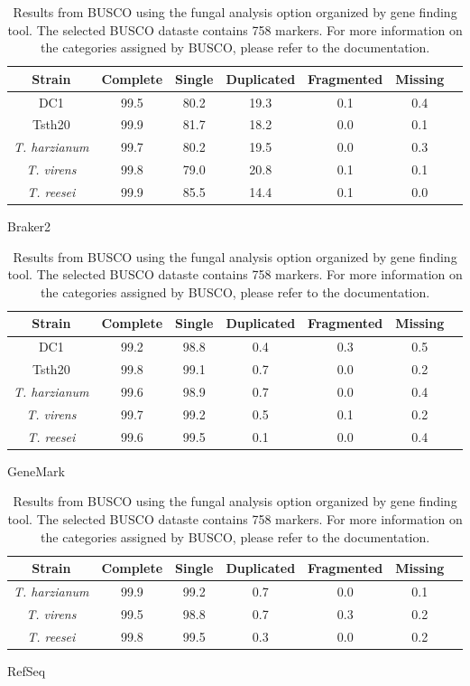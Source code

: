 \begin{table}
  \begin{center}
    \begin{subtable}{\textwidth}
      \centering
      \begin{tabular}{|c|c|c|c|c|c|c|}
        \hline
        Strain & Complete & Single & Duplicated & Fragmented & Missing \\ \hline
        DC1 & 99.5 & 80.2 & 19.3 & 0.1 & 0.4 \\ \hline
        Tsth20 & 99.9 & 81.7 & 18.2 & 0.0 & 0.1 \\ \hline
        \textit{T. harzianum} & 99.7 & 80.2 & 19.5 & 0.0 & 0.3 \\ \hline
        \textit{T. virens} & 99.8 & 79.0 & 20.8 & 0.1 & 0.1 \\ \hline
        \textit{T. reesei} & 99.9 & 85.5 & 14.4 & 0.1 & 0.0 \\ \hline
      \end{tabular}
      \caption{Braker2}
    \end{subtable}
    \begin{subtable}{\textwidth}
      \centering
      \begin{tabular}{|c|c|c|c|c|c|c|}
        \hline
        Strain & Complete & Single & Duplicated & Fragmented & Missing \\ \hline
        DC1 & 99.2 & 98.8 & 0.4 & 0.3 & 0.5 \\ \hline
        Tsth20 & 99.8 & 99.1 & 0.7 & 0.0 & 0.2 \\ \hline
        \textit{T. harzianum} & 99.6 & 98.9 & 0.7 & 0.0 & 0.4 \\ \hline
        \textit{T. virens} & 99.7 & 99.2 & 0.5 & 0.1 & 0.2 \\ \hline
        \textit{T. reesei} & 99.6 & 99.5 & 0.1 & 0.0 & 0.4 \\ \hline
      \end{tabular}
      \caption{GeneMark}
    \end{subtable}
    \begin{subtable}{\textwidth}
      \centering
      \begin{tabular}{|c|c|c|c|c|c|c|}
        \hline
        Strain & Complete & Single & Duplicated & Fragmented & Missing \\ \hline
        \textit{T. harzianum} & 99.9 & 99.2 & 0.7 & 0.0 & 0.1 \\ \hline
        \textit{T. virens} & 99.5 & 98.8 & 0.7 & 0.3 & 0.2 \\ \hline
        \textit{T. reesei} & 99.8 & 99.5 & 0.3 & 0.0 & 0.2 \\ \hline
      \end{tabular}
      \caption{RefSeq}
    \end{subtable}
  \end{center}
  \caption{Results from BUSCO using the fungal analysis option
    organized by gene finding tool. The selected BUSCO dataste
    contains 758 markers. For more information on the categories
    assigned by BUSCO, please refer to the documentation.}
  \label{table:busco}
\end{table}

